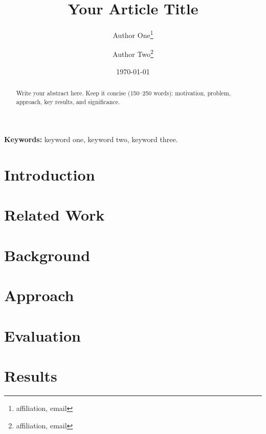 \documentclass[11pt,a4paper]{article}
\title{Your Article Title}
\author{
  Author One\thanks{affiliation, email} \and
  Author Two\thanks{affiliation, email}
}
\date{\today}
\begin{document}
\maketitle

\begin{abstract}
  Write your abstract here. Keep it concise (150--250 words): motivation, problem,
  approach, key results, and significance.
\end{abstract}

\noindent\textbf{Keywords:} keyword one, keyword two, keyword three.

\section{Introduction}
\label{sec:intro}

\lipsum[1]   %

\section{Related Work}
\label{sec:related}

\lipsum[2]

\section{Background}
\label{sec:background}

\lipsum[3]

\section{Approach}
\label{sec:approach}

\lipsum[4-5]

\section{Evaluation}
\label{sec:evaluation}

\lipsum[6]

\section{Results}
\label{sec:results}
\end{document}
